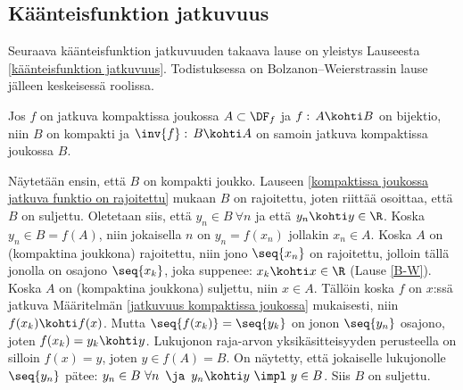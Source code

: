 \subsection*{Käänteisfunktion jatkuvuus}

Seuraava käänteisfunktion jatkuvuuden takaava lause on yleistys Lauseesta 
\ref{käänteisfunktion jatkuvuus}. Todistuksessa on Bolzanon--Weierstrassin lause jälleen
keskeisessä roolissa.
\begin{*Lause} \label{R:n käänteisfunktiolause} Jos $f$ on jatkuva kompaktissa joukossa
$A\subset\DF_f$ ja $f:\,A \kohti B$ on bijektio, niin $B$ on kompakti ja
$\inv{f}:\,B \kohti A$ on samoin jatkuva kompaktissa joukossa $B$.
\end{*Lause}
\tod  Näytetään ensin, että $B$ on kompakti joukko. Lauseen
\ref{kompaktissa joukossa jatkuva funktio on rajoitettu} mukaan $B$ on rajoitettu, joten 
riittää osoittaa, että $B$ on suljettu. Oletetaan siis, että $y_n \in B\ \forall n$ ja 
että $y_n \kohti y\in\R$. Koska $y_n \in B=f(A)$, niin jokaisella $n$ on $y_n=f(x_n)$ jollakin
$x_n \in A$. Koska $A$ on (kompaktina joukkona) rajoitettu, niin jono $\seq{x_n}$ on
rajoitettu, jolloin tällä jonolla on osajono $\seq{x_k}$, joka suppenee: $x_k \kohti x\in\R$
(Lause \ref{B-W}). Koska $A$ on (kompaktina joukkona) suljettu, niin $x \in A$. Tällöin koska
$f$ on $x$:ssä jatkuva Määritelmän \ref{jatkuvuus kompaktissa joukossa} mukaisesti, niin
 $f(x_k) \kohti f(x)$. Mutta $\seq{f(x_k)}=\seq{y_k}$ on jonon $\seq{y_n}$ osajono, joten
$f(x_k)=y_k \kohti y$. Lukujonon raja-arvon yksikäsitteisyyden perusteella on silloin
$f(x)=y$, joten $y \in f(A)=B$. On näytetty, että jokaiselle lukujonolle $\seq{y_n}$ pätee: 
$y_n \in B\ \forall n\,\ \ja\,\ y_n \kohti y\ \impl\ y \in B$. Siis $B$ on suljettu.

